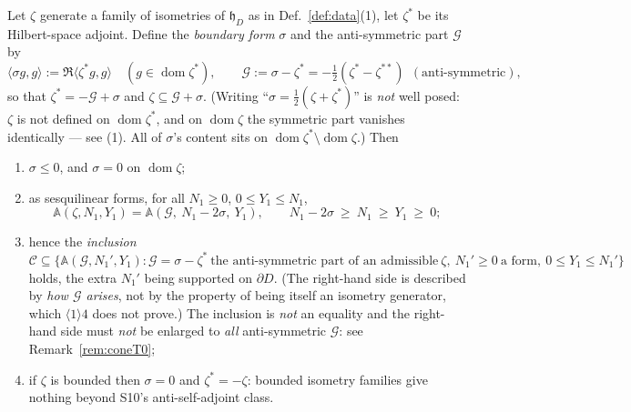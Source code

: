 \documentclass[11pt]{article}
\newcommand{\hh}{\mathfrak h}
\newcommand{\Aop}{\mathbb A}
\begin{document}
\begin{theorem}\label{thm:bdry}
Let $\zeta$ generate a family of isometries of $\hh_D$ as in Def.~\ref{def:data}(1), let
$\zeta^*$ be its Hilbert-space adjoint.  Define the \emph{boundary form} $\sigma$ and the
anti-symmetric part $\mathcal G$ by
\begin{equation}\label{eq:GS}
 \langle\sigma g,g\rangle:=\Re\langle\zeta^*g,g\rangle\quad(g\in\operatorname{dom}\zeta^*),
 \qquad \mathcal G:=\sigma{-}\zeta^*=-\tfrac12(\zeta^*{-}\zeta^{**})\ \ (\text{anti-symmetric}),
\end{equation}
so that $\zeta^*=-\mathcal G+\sigma$ and $\zeta\subseteq\mathcal G+\sigma$.  (Writing
``$\sigma=\frac12(\zeta+\zeta^*)$'' is \emph{not} well posed: $\zeta$ is not defined on
$\operatorname{dom}\zeta^*$, and on $\operatorname{dom}\zeta$ the symmetric part vanishes
identically --- see (1).  All of $\sigma$'s content sits on
$\operatorname{dom}\zeta^*\setminus\operatorname{dom}\zeta$.)
Then
\begin{enumerate}[leftmargin=1.6em,itemsep=1pt]
\item $\sigma\le0$, and $\sigma=0$ on $\operatorname{dom}\zeta$;
\item as sesquilinear forms, for all $N_1\ge0$, $0\le Y_1\le N_1$,
 \begin{equation}\label{eq:absorb}
  \Aop(\zeta,N_1,Y_1)=\Aop(\mathcal G,\ N_1-2\sigma,\ Y_1),\qquad
  N_1-2\sigma\ \ge\ N_1\ \ge\ Y_1\ \ge\ 0 ;
 \end{equation}
\item hence the \emph{inclusion}
 $\mathcal C\subseteq\{\Aop(\mathcal G,N_1',Y_1):\mathcal G=\sigma{-}\zeta^*\ \text{the
 anti-symmetric part of an admissible}\ \zeta,\ N_1'\ge0\ \text{a form},\ 0\le Y_1\le N_1'\}$
 holds, the extra $N_1'$ being supported on $\partial D$.  (The right-hand side is
 described by \emph{how $\mathcal G$ arises}, not by the property of being itself an
 isometry generator, which $\langle1\rangle4$ does not prove.)  The inclusion is
 \emph{not} an equality and the right-hand side must \emph{not} be enlarged to \emph{all}
 anti-symmetric $\mathcal G$: see Remark~\ref{rem:coneT0};
\item if $\zeta$ is bounded then $\sigma=0$ and $\zeta^*=-\zeta$: bounded isometry families
 give nothing beyond S10's anti-self-adjoint class.
\end{enumerate}
\end{theorem}
\end{document}
